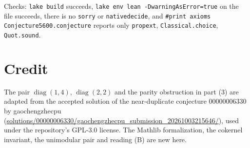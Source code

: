 \documentclass[11pt]{article}
\renewcommand{\_}{\oldus\allowbreak}
\theoremstyle{remark}
\begin{document}
Checks: \texttt{lake build} succeeds, \texttt{lake env lean -DwarningAsError=true} on
the file succeeds, there is no \texttt{sorry} or \texttt{native\_decide}, and
\texttt{\#print axioms Conjecture5600.conjecture\_5600} reports only
\texttt{propext}, \texttt{Classical.choice}, \texttt{Quot.sound}.

\section*{Credit}
The pair $\operatorname{diag}(1,4)$, $\operatorname{diag}(2,2)$ and the parity
obstruction in part (3) are adapted from the accepted solution of the near-duplicate
conjecture 00000006330 by gaochengzhecpu
(\url{solutions/00000006330/gaochengzhecpu_submission_20261003215646/}), used under the
repository's GPL-3.0 license. The Mathlib formalization, the cokernel invariant, the
unimodular pair and reading (B) are new here.
\end{document}
